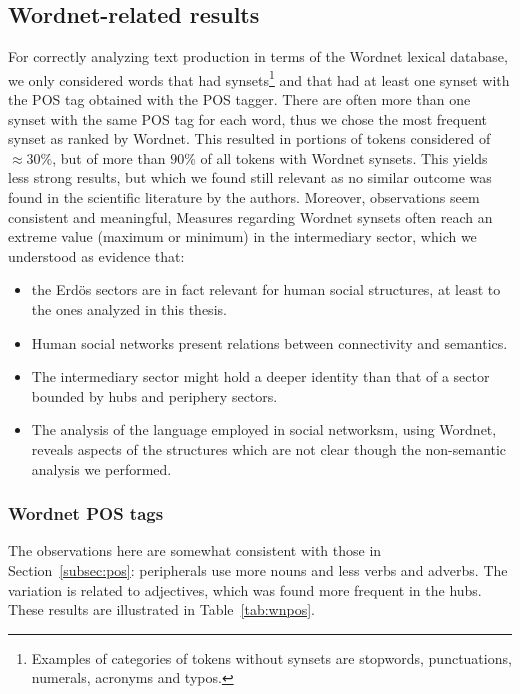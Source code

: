 \documentclass[review]{elsarticle}
\begin{document}
\subsection{Wordnet-related results}
For correctly analyzing text production in terms of the Wordnet lexical database,
we only considered words that had synsets\footnote{
  Examples of categories of tokens without synsets are stopwords, punctuations, numerals, acronyms and typos.}
and that had at least one synset with the POS tag obtained with the POS tagger.
There are often more than one synset with the same POS tag for each word,
thus we chose the most frequent synset as ranked by Wordnet.
This resulted in portions of tokens considered of $\approx 30\%$,
but of more than $90\%$ of all tokens with Wordnet synsets.
This yields less strong results, but which we found still relevant as no similar outcome was found in the scientific literature by the authors.
Moreover, observations seem consistent and meaningful,
Measures regarding Wordnet synsets often reach an extreme value (maximum or minimum)
in the intermediary sector, which we understood as evidence that:
\begin{itemize}
\item the Erd\"os sectors are in fact relevant for human social structures, at least to the ones analyzed in this thesis.
\item Human social networks present relations between connectivity and semantics.
\item The intermediary sector might hold a deeper identity than that of a sector bounded by hubs and periphery sectors.
\item The analysis of the language employed in social networksm, using Wordnet, reveals aspects of the structures which are not clear though the non-semantic analysis we performed.
\end{itemize}

\subsubsection{Wordnet POS tags}\label{subsec:wnpos}
The observations here are somewhat consistent with those in Section~\ref{subsec:pos}:
peripherals use more nouns and less verbs and adverbs.
The variation is related to adjectives, which was found more frequent in the hubs.
These results are illustrated in Table~\ref{tab:wnpos}.

\FloatBarrier
\end{document}
